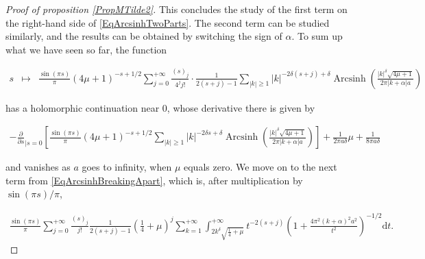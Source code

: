 \documentclass{jams-l}
\theoremstyle{definition}
\theoremstyle{remark}
\numberwithin{equation}{section}
\DeclareMathOperator{\arcsinh}{Arcsinh}
\begin{document}
\begin{proof}[Proof of proposition \ref{PropMTilde2}]
                    \noindent This concludes the study of the first term on the right-hand side of \eqref{EqArcsinhTwoParts}. The second term can be studied similarly, and the results can be obtained by switching the sign of $\alpha$. To sum up what we have seen so far, the function
                    
                    \[ \begin{array}{lll}
                            \scriptstyle s & \scriptstyle \longmapsto & \scriptstyle \frac{\sin \left( \pi s \right)}{\pi} \left( 4 \mu + 1 \right)^{-s+1/2} \sum\limits_{j = 0}^{+\infty} \frac{\left( s \right)_j}{4^j j!} \cdot \frac{1}{2 \left( s + j \right) - 1} \sum\limits_{\left \vert k \right \vert \geqslant 1}  \left \vert k \right \vert^{- 2 \delta \left( s + j \right) + \delta} \arcsinh \left( \frac{\left \vert k \right \vert^{\delta} \sqrt{4 \mu + 1}}{2 \pi \left \vert k + \alpha \right \vert a} \right)
                        \end{array} \]
                    
                    \noindent has a holomorphic continuation near $0$, whose derivative there is given by
                    
                    \[ \begin{array}{c}
                            \scriptstyle - \frac{\partial}{\partial s}_{\left \vert s = 0 \right.} \left[ \frac{\sin \left( \pi s \right)}{\pi} \left( 4 \mu + 1 \right)^{-s+1/2} \sum\limits_{\left \vert k \right \vert \geqslant 1} \left \vert k \right \vert^{- 2 \delta s + \delta} \arcsinh \left( \frac{\left \vert k \right \vert^{\delta} \sqrt{4 \mu + 1}}{2 \pi \left \vert k + \alpha \right \vert a} \right) \right] + \frac{1}{2 \pi a \delta} \mu + \frac{1}{8 \pi a \delta}
                        \end{array} \]
                        
                    \noindent and vanishes as $a$ goes to infinity, when $\mu$ equals zero. We move on to the next term from \eqref{EqArcsinhBreakingApart}, which is, after multiplication by $\sin \left( \pi s \right)/\pi$,
                    
                    \[ \begin{array}{c}
                            \frac{\sin \left( \pi s \right)}{\pi} \sum\limits_{j = 0}^{+\infty} \frac{\left( s \right)_j}{j!} \frac{1}{2 \left( s + j \right) - 1} \left( \frac{1}{4} + \mu \right)^j \sum\limits_{k = 1}^{+\infty} \int_{2 k^{\delta} \sqrt{\frac{1}{4} + \mu}}^{+ \infty} t^{- 2 \left( s + j \right)} \left( 1 + \frac{4 \pi^2 \left( k + \alpha \right)^2 a^2}{t^2} \right)^{-1/2} \mathrm{d}t.
                        \end{array} \]
                        

\end{proof}
\end{document}
